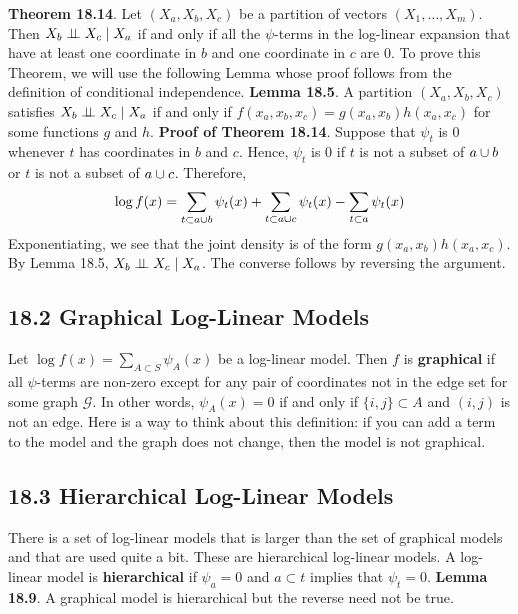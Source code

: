 \textbf{Theorem 18.14}. Let \((X_a, X_b, X_c)\) be a partition of
vectors \((X_{1}, \dots, X_m)\). Then \(X_b \perp\!\!\!\perp X_c \; | \; X_a\)
if and only if all the \(\psi\)-terms in the log-linear expansion that
have at least one coordinate in \(b\) and one coordinate in \(c\) are 0.
To prove this Theorem, we will use the following Lemma whose proof
follows from the definition of conditional independence.
\textbf{Lemma 18.5}. A partition \((X_a, X_b, X_c)\) satisfies
\(X_b \perp\!\!\!\perp X_c \; | \; X_a\) if and only if
\(f(x_a, x_b, x_c) = g(x_a, x_b) h(x_a, x_c)\) for some functions \(g\)
and \(h\).
\textbf{Proof of Theorem 18.14}. Suppose that \(\psi_t\) is 0 whenever
\(t\) has coordinates in \(b\) and \(c\). Hence, \(\psi_t\) is 0 if
\(t\) is not a subset of \(a \cup b\) or \(t\) is not a subset of
\(a \cup c\). Therefore,
\[
\log f(x) = \sum_{t \subset a \cup b} \psi_t(x) + \sum_{t \subset a \cup c} \psi_t(x) - \sum_{t \subset a} \psi_t(x)
\]
Exponentiating, we see that the joint density is of the form
\(g(x_a, x_b) h(x_a, x_c)\). By Lemma 18.5,
\(X_b \perp\!\!\!\perp X_c \; | \; X_a\). The converse follows by reversing
the argument.

\subsection*{18.2 Graphical Log-Linear Models}\label{graphical-log-linear-models}
Let \(\log f(x) = \sum_{A \subset S} \psi_A(x)\) be a log-linear model.
Then \(f\) is \textbf{graphical} if all \(\psi\)-terms are non-zero
except for any pair of coordinates not in the edge set for some graph
\(\mathcal{G}\). In other words, \(\psi_A(x) = 0\) if and only if
\(\{i, j\} \subset A\) and \((i, j)\) is not an edge.
Here is a way to think about this definition: if you can add a term to
the model and the graph does not change, then the model is not
graphical.

\subsection*{18.3 Hierarchical Log-Linear Models}\label{hierarchical-log-linear-models}
There is a set of log-linear models that is larger than the set of
graphical models and that are used quite a bit. These are hierarchical
log-linear models.
A log-linear model is \textbf{hierarchical} if \(\psi_a = 0\) and
\(a \subset t\) implies that \(\psi_t = 0\).
\textbf{Lemma 18.9}. A graphical model is hierarchical but the reverse
need not be true.


